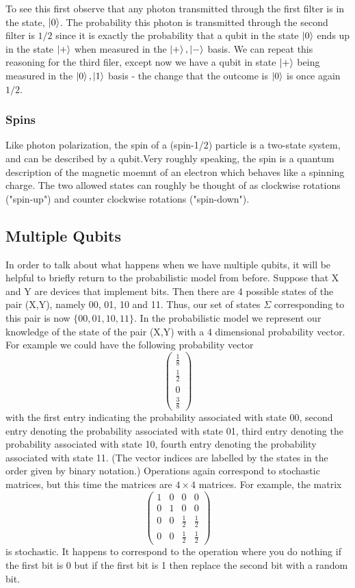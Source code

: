To see this first observe that any photon transmitted through the first filter is in the state, $\ket{0}$. The probability this photon is transmitted through the second filter is $1/2$ since it is exactly the probability that a qubit in the state $\ket{0}$ ends up in the state $\ket{+}$ when measured in the $\ket{+},\ket{-}$ basis. We can repeat this reasoning for the third filer, except now we have a qubit in state $\ket{+}$ being measured in the $\ket{0},\ket{1}$ basis - the change that the outcome is $\ket{0}$ is once again $1/2$.

\subsubsection{Spins}
Like photon polarization, the spin of a (spin-1/2) particle is a two-state system, and can be described by a qubit.Very roughly speaking, the spin is a quantum description of the magnetic moemnt of an electron which behaves like a spinning charge. The two allowed states can roughly be thought of as clockwise rotations ("spin-up") and counter clockwise rotations ("spin-down").

\subsection{Multiple Qubits}
In order to talk about what happens when we have multiple qubits, it will be helpful to briefly return to the probabilistic model from before. Suppose that X and Y are devices that implement bits. Then there are 4 possible states of the pair (X,Y), namely 00, 01, 10 and 11. Thus, our set of states $\Sigma$ corresponding to this pair is now $\{00,01,10,11\}$. In the probabilistic model we represent our knowledge of the state of the pair (X,Y) with a 4 dimensional probability vector. For example we could have the following probability vector
\[
\begin{pmatrix} \frac{1}{8} \\ \frac{1}{2} \\ 0 \\ \frac{3}{8} \end{pmatrix}
\]
with the first entry indicating the probability associated with state 00, second entry denoting the probability associated with state 01, third entry denoting the probability associated with state 10, fourth entry denoting the probability associated with state 11. (The vector indices are labelled by the states in the order given by binary notation.) Operations again correspond to stochastic matrices, but this time the matrices are $4 \times 4$ matrices. For example, the matrix
\[
\begin{pmatrix} 1 & 0 & 0 & 0 \\ 0 & 1 & 0 & 0 \\ 0 & 0 & \frac{1}{2} & \frac{1}{2} \\ 0 & 0 & \frac{1}{2} & \frac{1}{2} \end{pmatrix}
\]
is stochastic. It happens to correspond to the operation where you do nothing if the first bit is 0 but if the first bit is 1 then replace the second bit with a random bit.

